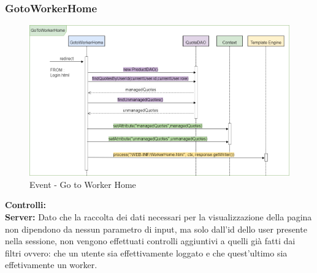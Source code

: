 \documentclass[a4paper, 12pt]{article}
\begin{document}
\subsubsection{GotoWorkerHome}
\begin{figure}[h!]
	\centering
	\includegraphics[width=1\textwidth]{PureHTML_images/GotoWorkerHome.png}
	\caption{Event - Go to Worker Home}
	\label{figure:gotoworkerhome_sd}
\end{figure}
\noindent \textbf{Controlli:}\\
\noindent \textbf{Server:} 
\noindent Dato che la raccolta dei dati necessari per la visualizzazione della pagina non dipendono da nessun parametro di input, ma solo dall'id dello user presente nella sessione, non vengono effettuati controlli aggiuntivi a quelli 
già fatti dai filtri ovvero: che un utente sia effettivamente loggato e che quest'ultimo sia effetivamente un worker.
\newpage
\end{document}
